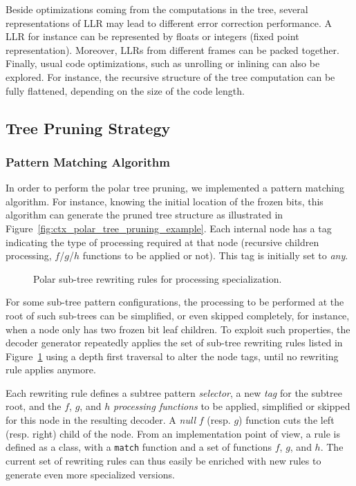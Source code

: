 Beside optimizations coming from the computations in the tree, several
representations of LLR may lead to different error correction performance. A LLR
for instance can be represented by floats or integers (fixed point
representation). Moreover, LLRs from different frames can be packed together.
Finally, usual code optimizations, such as unrolling or inlining can also be
explored. For instance, the recursive structure of the tree computation can be
fully flattened, depending on the size of the code length.

\subsection{Tree Pruning Strategy}
\label{sec:opt_polar_tree_pruning}

\subsubsection{Pattern Matching Algorithm}
\label{sec:opt_polar_pattern_matching}

In order to perform the polar tree pruning, we implemented a pattern matching
algorithm. For instance, knowing the initial location of the frozen bits, this
algorithm can generate the pruned tree structure as illustrated in
Figure~\ref{fig:ctx_polar_tree_pruning_example}. Each internal node has a tag
indicating the type of processing required at that node (recursive children
processing, $f$/$g$/$h$ functions to be applied or not). This tag is initially
set to \emph{any}.

\begin{figure}[htp]
  \centering
  \caption{Polar sub-tree rewriting rules for processing specialization.}
  \label{fig:opt_polar_patterns}
\end{figure}

For some sub-tree pattern configurations, the processing to be performed at the
root of such sub-trees can be simplified, or even skipped completely, for
instance, when a node only has two frozen bit leaf children. To exploit such
properties, the decoder generator repeatedly applies the set of sub-tree
rewriting rules listed in Figure~\ref{fig:opt_polar_patterns} using a depth
first traversal to alter the node tags, until no rewriting rule applies anymore.

Each rewriting rule defines a subtree pattern \emph{selector}, a new \emph{tag}
for the subtree root, and the $f$, $g$, and $h$ \emph{processing functions} to
be applied, simplified or skipped for this node in the resulting decoder. A
\emph{null} $f$ (resp. $g$) function cuts the left (resp. right) child of the
node. From an implementation point of view, a rule is defined as a class, with a
\verb|match| function and a set of functions $f$, $g$, and $h$. The current
set of rewriting rules can thus easily be enriched with new rules to generate
even more specialized versions.

